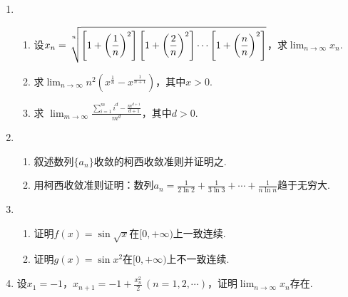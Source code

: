 \documentclass{article}
\begin{document}
\begin{enumerate}
\item
\begin{enumerate}
\item
设$\displaystyle x_n=\sqrt[\uproot{10}n]{\left[1+\left(\frac{1}{n}\right)^2\right]\left[1+\left(\frac{2}{n}\right)^2\right]\cdots\left[1+\bigg(\frac{n}{n}\bigg)^2\right]}$，求$\displaystyle\lim_{n\to\infty}x_n$.
\item
求$\displaystyle\lim_{n\to\infty}n^2\left(x^{\frac{1}{n}}-x^{\frac{1}{n+1}}\right)$，其中$x>0$.
\item
求 $\displaystyle \lim_{m\to\infty}\frac{\displaystyle\sum_{i=1}^{m}i^d-\frac{m^{d+1}}{d+1}}{\displaystyle m^d}$，其中$d>0$.
\end{enumerate}
\item
\begin{enumerate}
\item
叙述数列$\{a_n\}$收敛的柯西收敛准则并证明之.
\item
用柯西收敛准则证明：数列$\displaystyle a_n=\frac{1}{2\ln 2}+\frac{1}{3\ln 3}+\cdots+\frac{1}{n\ln n}$趋于无穷大.
\end{enumerate}
\item
\begin{enumerate}
\item
证明$f(x)=\sin\sqrt{x}$在$[0,+\infty)$上一致连续.
\item
证明$g(x)=\sin x^2$在$[0,+\infty)$上不一致连续.
\end{enumerate}
\item
设$x_1=-1$，$\displaystyle x_{n+1}=-1+\frac{x_n^2}{2}\,(n=1,2,\cdots)$，证明$\displaystyle \lim_{n\to\infty}x_n$存在.

\end{enumerate}
\end{document}
